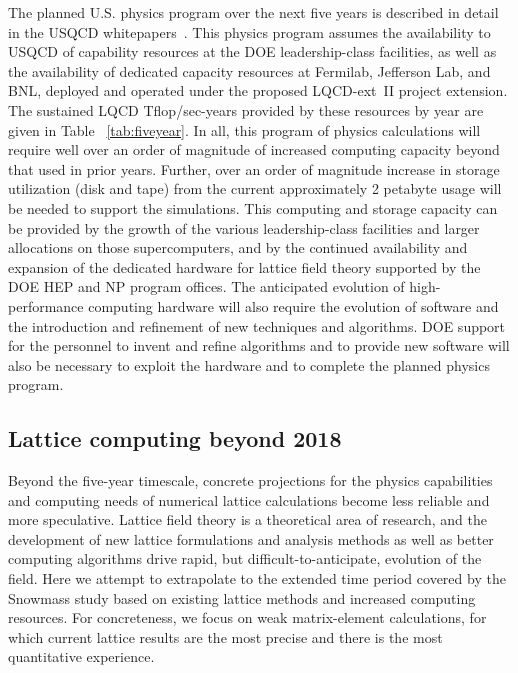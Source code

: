 The planned U.S. physics program over the next five years is described in detail
in the USQCD
whitepapers~\cite{USQCD_EF_whitepaper13,USQCD_IF_whitepaper13,USQCD_NP_whitepaper13,USQCD_Thermo_whitepaper13}.
This physics program assumes the availability to USQCD of capability resources
at the DOE leadership-class facilities, as well as the availability of dedicated
capacity resources at Fermilab, Jefferson Lab, and BNL, deployed and operated
under the proposed LQCD-ext~II project extension.  The sustained LQCD Tflop/sec-years provided by
these resources by year are given in Table ~\ref{tab:fiveyear}. In all, this
program of physics calculations 
will require well over an order of magnitude of increased computing capacity
beyond that used in prior years.  Further, over an order of magnitude increase
in storage utilization (disk and tape) from the current approximately 2
petabyte usage will be needed to support the simulations.   This computing and
storage capacity can be provided by the growth
of the various leadership-class facilities and larger allocations on those
supercomputers, and by the continued availability and expansion of the
dedicated hardware for lattice field theory supported by the DOE HEP and NP
program offices.  The anticipated evolution of high-performance computing
hardware will also require the evolution of software and the introduction and
refinement of new techniques and algorithms.  DOE support for the personnel to
invent and refine algorithms and to provide new software will also be necessary to
exploit the hardware and to complete the planned physics program.

\subsection{Lattice computing beyond 2018}
\label{subsec:lqcd:future}

Beyond the five-year timescale, concrete projections for the physics
capabilities and computing needs of numerical lattice calculations become less
reliable and more speculative.  Lattice field theory is a theoretical area of
research, and the development of new lattice formulations and analysis methods
as well as better computing algorithms drive rapid, but
difficult-to-anticipate, evolution of the field.  Here we attempt to
extrapolate to the extended time period covered by the Snowmass study based on
existing lattice methods and increased computing resources.  For concreteness,
we focus on weak matrix-element calculations, for which current lattice
results are the most precise and there is the most quantitative experience.

